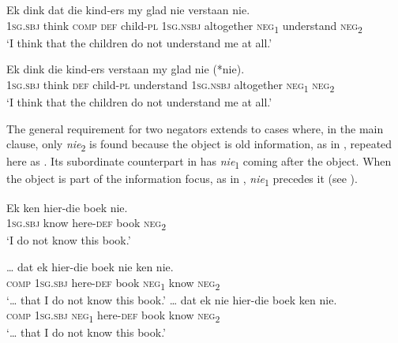 \documentclass[output=paper,colorlinks,citecolor=brown]{langscibook}
\begin{document}
\ea\label{ex:afr:20}
    
    \ea\label{ex:afr:20a}
        \gll Ek dink dat die kind-ers my glad nie verstaan nie.\\
             1\textsc{sg.sbj} think  \textsc{comp} \textsc{def} child-\textsc{pl} \textsc{1sg.nsbj} altogether \textsc{neg}\textsubscript{1} understand  \textsc{neg}\textsubscript{2}\\
        \glt ‘I think that the children do not understand me at all.’
    
    \ex\label{ex:afr:20b}
        \gll Ek dink die kind-ers verstaan my glad nie (*nie). \\
             1\textsc{sg.sbj} think  \textsc{def} child-\textsc{pl} understand  \textsc{1sg.nsbj} altogether \textsc{neg}\textsubscript{1} \textsc{neg}\textsubscript{2}\\
        \glt ‘I think that the children do not understand me at all.’
    \z
\z 


The general requirement for two negators extends to cases where, in the main clause, only \textit{nie}\textsubscript{2} is found because the object is old information, as in , repeated here as . Its subordinate counterpart in  has \textit{nie}\textsubscript{1} coming after the object. When the object is part of the information focus, as in , \textit{nie}\textsubscript{1} precedes it (see \citealt[106--107]{Biberauer2008}).

\ea\label{ex:afr:21}
    \ea\label{ex:afr:21a}
        \gll Ek ken hier-die boek nie. \\ 
             \textsc{1sg.sbj} know  here-\textsc{def} book  \textsc{neg}\textsubscript{2} \\
        \glt ‘I do not know this book.’
    
    \ex\label{ex:afr:21b}
        \gll …  dat ek hier-die boek nie ken nie. \\
             {} \textsc{comp} \textsc{1sg.sbj} here-\textsc{def} book  \textsc{neg}\textsubscript{1} know  \textsc{neg}\textsubscript{2}\\
        \glt ‘… that I do not know this book.’
    \ex\label{ex:afr:21c}
        \gll … dat ek nie  hier-die boek ken nie. \\
             {} \textsc{comp} \textsc{1sg.sbj} \textsc{neg}\textsubscript{1} here-\textsc{def} book know \textsc{neg}\textsubscript{2}\\
        \glt ‘… that I do not know this book.’ 
    \z
\z 
\end{document}
